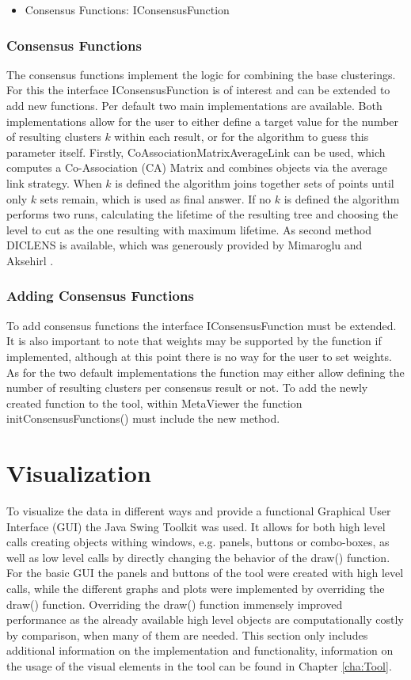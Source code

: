 \documentclass[
	a4paper,
	english,
	twoside,
	openright,               
	11pt                            
	]{report}
\begin{document}
\begin{itemize}
  \item Consensus Functions: IConsensusFunction
\end{itemize}

\subsubsection{Consensus Functions}
The consensus functions implement the logic for combining the base clusterings. For this the interface IConsensusFunction is of interest and can be extended to add new functions. Per default two main implementations are available. Both implementations allow for the user to either define a target value for the number of resulting clusters $k$ within each result, or for the algorithm to guess this parameter itself. Firstly, CoAssociationMatrixAverageLink can be used, which computes a Co-Association (CA) Matrix and combines objects via the average link strategy. When $k$ is defined the algorithm joins together sets of points until only $k$ sets remain, which is used as final answer. If no $k$ is defined the algorithm performs two runs, calculating the lifetime \cite{lifetime} of the resulting tree and choosing the level to cut as the one resulting with maximum lifetime. As second method DICLENS is available, which was generously provided by Mimaroglu and Aksehirl \cite{DICLENS}.

\subsubsection*{Adding Consensus Functions}
To add consensus functions the interface IConsensusFunction must be extended. It is also important to note that weights may be supported by the function if implemented, although at this point there is no way for the user to set weights. As for the two default implementations the function may either allow defining the number of resulting clusters per consensus result or not. To add the newly created function to the tool, within MetaViewer the function initConsensusFunctions() must include the new method.

\section{Visualization}

To visualize the data in different ways and provide a functional Graphical User Interface (GUI) the Java Swing \cite{javaswing} Toolkit was used. It allows for both high level calls creating objects withing windows, e.g. panels, buttons or combo-boxes, as well as low level calls by directly changing the behavior of the draw() function. For the basic GUI the panels and buttons of the tool were created with high level calls, while the different graphs and plots were implemented by overriding the draw() function. Overriding the draw() function immensely improved performance as the already available high level objects are computationally costly by comparison, when many of them are needed. This section only includes additional information on the implementation and functionality, information on the usage of the visual elements in the tool can be found in Chapter \ref{cha:Tool}.
\end{document}
